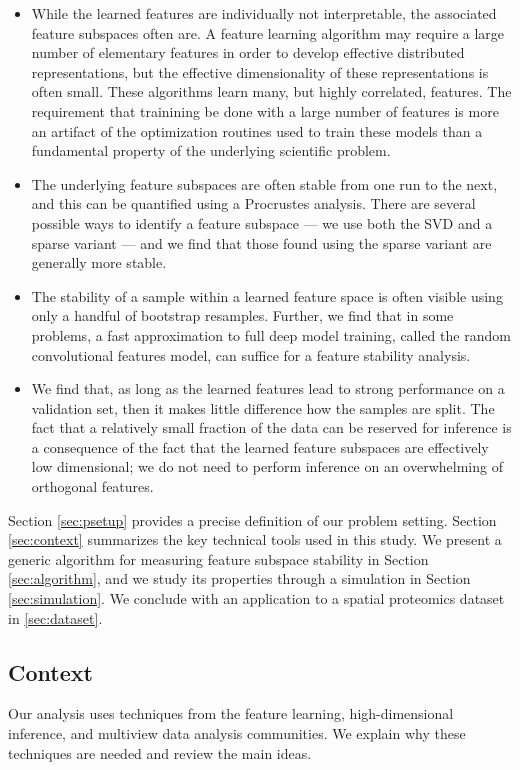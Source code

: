 \begin{itemize}
\item While the learned features are individually not interpretable, the associated feature subspaces often are. A feature learning algorithm may require a large number of elementary features in order to develop effective distributed representations, but the effective dimensionality of these representations is often small. These algorithms learn many, but highly correlated, features. The requirement that trainining be done with a large number of features is more an artifact of the optimization routines used to train these models than a fundamental property of the underlying scientific problem.
\item The underlying feature subspaces are often stable from one run to the next, and this can be quantified using a Procrustes analysis. There are several possible ways to identify a feature subspace — we use both the SVD and a sparse variant — and we find that those found using the sparse variant are generally more stable.
\item The stability of a sample within a learned feature space is often visible using only a handful of bootstrap resamples. Further, we find that in some problems, a fast approximation to full deep model training, called the random convolutional features model, can suffice for a feature stability analysis.
\item We find that, as long as the learned features lead to strong performance on a validation set, then it makes little difference how the samples are split. The fact that a relatively small fraction of the data can be reserved for inference is a consequence of the fact that the learned feature subspaces are effectively low dimensional; we do not need to perform inference on an overwhelming of orthogonal features.
\end{itemize}

Section \ref{sec:psetup} provides a precise definition of our problem setting. Section \ref{sec:context} summarizes the key technical tools used in this study. We present a generic algorithm for measuring feature subspace stability in Section \ref{sec:algorithm}, and we study its properties through a simulation in Section \ref{sec:simulation}. We conclude with an application to a spatial proteomics dataset in \ref{sec:dataset}.
\subsection{Context}

Our analysis uses techniques from the feature learning, high-dimensional inference, and multiview data analysis communities. We explain why these techniques are needed and review the main ideas.

